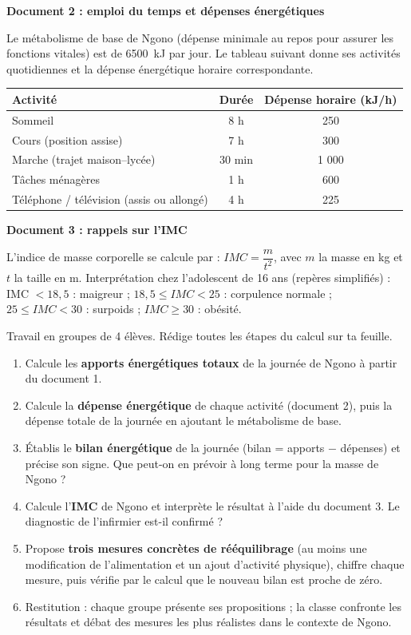 \documentclass[11pt]{article}
\newcommand{\cle}[1]{{\popxbold\color{popdark}#1}}
\newcounter{popsec}
\newcounter{popsub}
\newcommand{\courssub}[1]{%
  \stepcounter{popsub}%
  \par\vspace{9pt}\noindent{\popxbold\fontsize{11.5}{13}\selectfont\color{popink}{\color{poporange}\thepopsec.\thepopsub}\hspace{6pt}#1}\par\nopagebreak\vspace{4pt}
}
\begin{document}
\textbf{Document 2 : emploi du temps et dépenses énergétiques}

Le \cle{métabolisme de base} de Ngono (dépense minimale au repos pour assurer les fonctions vitales) est de \SI{6500}{kJ} par jour. Le tableau suivant donne ses activités quotidiennes et la dépense énergétique horaire correspondante.

\begin{center}
\begin{tabularx}{\linewidth}{|X|c|c|}
\hline
\rowcolor{popblueL} \textbf{Activité} & \textbf{Durée} & \textbf{Dépense horaire (kJ/h)} \\
\hline
Sommeil & 8 h & 250 \\
\hline
Cours (position assise) & 7 h & 300 \\
\hline
Marche (trajet maison--lycée) & 30 min & 1 000 \\
\hline
Tâches ménagères & 1 h & 600 \\
\hline
Téléphone / télévision (assis ou allongé) & 4 h & 225 \\
\hline
\end{tabularx}
\end{center}

\textbf{Document 3 : rappels sur l'IMC}

L'indice de masse corporelle se calcule par : $IMC = \dfrac{m}{t^{2}}$, avec $m$ la masse en kg et $t$ la taille en m. Interprétation chez l'adolescent de 16 ans (repères simplifiés) : IMC $< 18{,}5$ : maigreur ; $18{,}5 \leq IMC < 25$ : corpulence normale ; $25 \leq IMC < 30$ : surpoids ; $IMC \geq 30$ : obésité.

\courssub{Consignes}

Travail en groupes de 4 élèves. Rédige toutes les étapes du calcul sur ta feuille.

\begin{enumerate}
\item Calcule les \textbf{apports énergétiques totaux} de la journée de Ngono à partir du document 1.
\item Calcule la \textbf{dépense énergétique} de chaque activité (document 2), puis la dépense totale de la journée en ajoutant le métabolisme de base.
\item Établis le \textbf{bilan énergétique} de la journée (bilan = apports $-$ dépenses) et précise son signe. Que peut-on en prévoir à long terme pour la masse de Ngono ?
\item Calcule l'\textbf{IMC} de Ngono et interprète le résultat à l'aide du document 3. Le diagnostic de l'infirmier est-il confirmé ?
\item Propose \textbf{trois mesures concrètes de rééquilibrage} (au moins une modification de l'alimentation et un ajout d'activité physique), chiffre chaque mesure, puis vérifie par le calcul que le nouveau bilan est proche de zéro.
\item Restitution : chaque groupe présente ses propositions ; la classe confronte les résultats et débat des mesures les plus réalistes dans le contexte de Ngono.
\end{enumerate}
\end{document}
